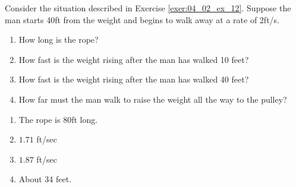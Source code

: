 {Consider the situation described in Exercise \ref{exer:04_02_ex_12}. Suppose the man starts 40ft from the weight and begins to walk away at a rate of 2ft/s. 
\begin{enumerate}
\item	How long is the rope?
\item	How fast is the weight rising after the man has walked 10 feet?
\item	How fast is the weight rising after the man has walked 40 feet?
\item	How far must the man walk to raise the weight all the way to the pulley?
\end{enumerate}
}
{
\begin{enumerate}
\item		The rope is 80ft long.
\item  $1.71$ ft/sec
\item	 $1.87$ ft/sec
\item		About 34 feet.
\end{enumerate}

}

